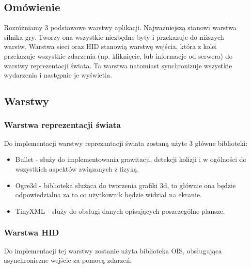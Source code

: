 \documentclass[12pt,a4paper,twoside]{article}
\begin{document}
\subsection{Omówienie}


Rozróżniamy 3 podstawowe warstwy aplikacji. Najważniejszą stanowi warstwa silnika gry. Tworzy ona wszystkie niezbędne byty i przekazuje do niższych warstw. Warstwa sieci oraz HID stanowią warstwę wejścia, która z kolei przekazuje wszystkie zdarzenia (np. kliknięcie, lub informacje od serwera) do warstwy reprezentacji świata. Ta warstwa natomiast synchronizuje wszystkie wydarzenia i następnie je wyświetla.

\subsection{Warstwy}


\subsubsection{Warstwa reprezentacji świata}

Do implementacji warstwy reprezantacji świata zostaną użyte 3 główne biblioteki:

\begin{itemize}
\item Bullet - służy do implementowania grawitacji, detekcji kolizji i w ogólności do wszystkich aspektów związanych z fizyką.
\item Ogre3d - biblioteka służąca do tworzenia grafiki 3d, to głównie ona będzie odpowiedzialna za to co użytkownik będzie widział na ekranie.
\item TinyXML - służy do obsługi danych opisujących poszczególne plansze.
\end{itemize}

\subsubsection{Warstwa HID}

Do implementacji tej warstwy zostanie użyta biblioteka OIS, obsługująca asynchroniczne wejście za pomocą zdarzeń. 
\end{document}
